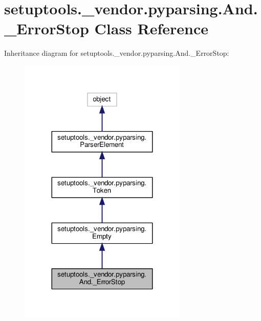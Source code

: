 \hypertarget{classsetuptools_1_1__vendor_1_1pyparsing_1_1And_1_1__ErrorStop}{}\section{setuptools.\+\_\+vendor.\+pyparsing.\+And.\+\_\+\+Error\+Stop Class Reference}
\label{classsetuptools_1_1__vendor_1_1pyparsing_1_1And_1_1__ErrorStop}


Inheritance diagram for setuptools.\+\_\+vendor.\+pyparsing.\+And.\+\_\+\+Error\+Stop\+:
\nopagebreak
\begin{figure}[H]
\begin{center}
\leavevmode
\includegraphics[width=227pt]{classsetuptools_1_1__vendor_1_1pyparsing_1_1And_1_1__ErrorStop__inherit__graph}
\end{center}
\end{figure}


